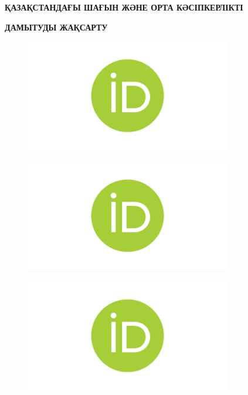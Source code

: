
{\bfseries ҚАЗАҚСТАНДАҒЫ ШАҒЫН ЖӘНЕ ОРТА КӘСІПКЕРЛІКТІ}

{\bfseries ДАМЫТУДЫ ЖАҚСАРТУ}

\begin{figure}[H]
	\centering
	\includegraphics[width=0.8\textwidth]{media/ekon2/image6}
	\caption*{}
\end{figure}

\begin{figure}[H]
	\centering
	\includegraphics[width=0.8\textwidth]{media/ekon2/image6}
	\caption*{}
\end{figure}

\begin{figure}[H]
	\centering
	\includegraphics[width=0.8\textwidth]{media/ekon2/image6}
	\caption*{}
\end{figure}

